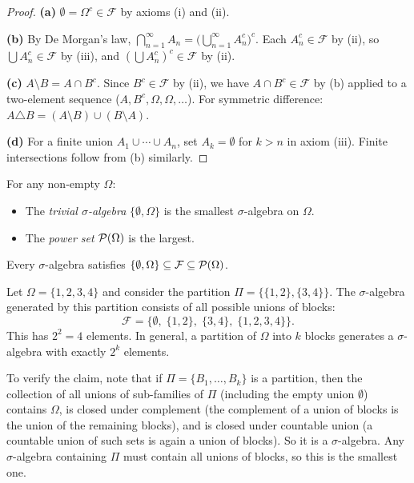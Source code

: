 \documentclass[11pt,a4paper]{article}
\begin{document}
\begin{proof}
\textbf{(a)} $\emptyset = \Omega^c \in \mathcal{F}$ by axioms (i) and (ii).

\textbf{(b)} By De Morgan's law,
$\bigcap_{n=1}^\infty A_n = \bigl(\bigcup_{n=1}^\infty A_n^c\bigr)^c$.
Each $A_n^c \in \mathcal{F}$ by (ii), so $\bigcup A_n^c \in \mathcal{F}$
by (iii), and $(\bigcup A_n^c)^c \in \mathcal{F}$ by (ii).

\textbf{(c)} $A \setminus B = A \cap B^c$. Since $B^c \in \mathcal{F}$ by
(ii), we have $A \cap B^c \in \mathcal{F}$ by (b) applied to a two-element
sequence ($A, B^c, \Omega, \Omega, \ldots$). For symmetric difference:
$A \triangle B = (A \setminus B) \cup (B \setminus A)$.

\textbf{(d)} For a finite union $A_1 \cup \cdots \cup A_n$, set
$A_k = \emptyset$ for $k > n$ in axiom (iii). Finite intersections follow
from (b) similarly.
\end{proof}

\begin{example}
\label{ex:extreme}
For any non-empty $\Omega$:
\begin{itemize}[nosep]
  \item The \emph{trivial $\sigma$-algebra}
    $\{\emptyset, \Omega\}$ is the smallest $\sigma$-algebra on $\Omega$.
  \item The \emph{power set} $\mathcal{P}(\Omega)$ is the largest.
\end{itemize}
Every $\sigma$-algebra satisfies
$\{\emptyset, \Omega\} \subseteq \mathcal{F} \subseteq \mathcal{P}(\Omega)$.
\end{example}

\begin{example}
\label{ex:partition}
Let $\Omega = \{1,2,3,4\}$ and consider the partition
$\Pi = \bigl\{\{1,2\}, \{3,4\}\bigr\}$. The $\sigma$-algebra generated by
this partition consists of all possible unions of blocks:
\begin{equation}
  \mathcal{F} = \bigl\{\emptyset,\;\{1,2\},\;\{3,4\},\;\{1,2,3,4\}\bigr\}.
\end{equation}
This has $2^2 = 4$ elements. In general, a partition of $\Omega$ into $k$
blocks generates a $\sigma$-algebra with exactly $2^k$ elements.

To verify the claim, note that if $\Pi = \{B_1, \ldots, B_k\}$ is a
partition, then the collection of all unions of sub-families of $\Pi$
(including the empty union $\emptyset$) contains $\Omega$, is closed
under complement (the complement of a union of blocks is the union of the
remaining blocks), and is closed under countable union (a countable union
of such sets is again a union of blocks). So it is a $\sigma$-algebra.
Any $\sigma$-algebra containing $\Pi$ must contain all unions of blocks,
so this is the smallest one.
\end{example}
\end{document}
